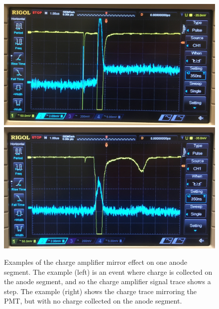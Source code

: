 \begin{figure}[htbp]
\begin{center}
\includegraphics[width=\halffig]{figures/etrains/900V_raw_charge.jpg}
\includegraphics[width=\halffig]{figures/etrains/900V_raw_nocharge.jpg}
\caption{Examples of the charge amplifier mirror effect on one anode segment. The example (left) is an event where charge is collected on the anode segment, and so the charge amplifier signal trace shows a step. The example (right) shows the charge trace mirroring the \ac{PMT}, but with no charge collected on the anode segment.}
\label{fig:charge_reflections}
\end{center}
\end{figure}

